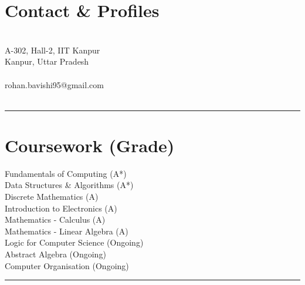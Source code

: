 \documentclass[letterpaper]{Formatting}
\begin{document}



\begin{minipage}[t]{0.3\textwidth}%


\section{Contact \& Profiles} 
\\
A-302, Hall-2, IIT Kanpur\\Kanpur, Uttar Pradesh\\\\
rohan.bavishi95@gmail.com\\\\
\sectionspace %
\vspace{-2ex}
\rule{5cm}{0.5pt}
\vspace{2ex}


\section{Coursework (Grade)}
Fundamentals of Computing (A*)\\
Data Structures \& Algorithms (A*)\\
Discrete Mathematics (A)\\
Introduction to Electronics (A)\\
Mathematics - Calculus (A)\\
Mathematics - Linear Algebra (A)\\
Logic for Computer Science (Ongoing)\\
Abstract Algebra (Ongoing)\\
Computer Organisation (Ongoing)\\
\sectionspace %
\vspace{-1ex}
\rule{5cm}{0.5pt}
\vspace{2ex}


\end{minipage}
\end{document}
